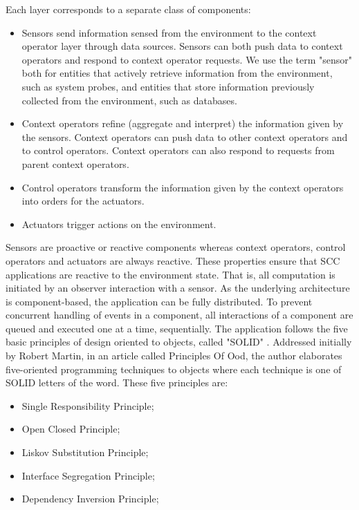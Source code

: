 \documentclass{acm_proc_article-sp}
\begin{document}
Each layer corresponds to a separate class of components: 
\begin{itemize}
\item Sensors send information sensed from the environment to the context operator layer through data sources. Sensors can both push data to context operators and respond to context operator requests. We use the term "sensor" both for entities that actively retrieve information from the environment, such as system probes, and entities that store information previously collected from the environment, such as databases.
\item Context operators refine (aggregate and interpret) the information given by the sensors. Context operators can push data to other context operators and to control operators. Context operators can also respond to requests from parent context operators. 
\item Control operators transform the information given by the context operators into orders for the actuators. 
\item Actuators trigger actions on the environment.
\end{itemize}

Sensors are proactive or reactive components whereas context operators, control operators and actuators are always reactive. These properties ensure that SCC applications are reactive to the environment state. That is, all computation is initiated by an observer interaction with a sensor.
\newline
\newline
As the underlying architecture is component-based, the application can be fully distributed. To prevent concurrent handling of events in a component, all interactions of a component are queued and executed one at a time, sequentially.
\newline
\newline
The application follows the five basic principles of design oriented to objects, called "SOLID" \cite{DanielPace}. Addressed initially by Robert Martin, in an article called Principles Of Ood, the author elaborates five-oriented programming techniques to objects where each technique is one of SOLID letters of the word. These five principles are:
\begin{itemize}
\item Single Responsibility Principle;
\item Open Closed Principle;
\item Liskov Substitution Principle;
\item Interface Segregation Principle;
\item Dependency Inversion Principle;
\end{itemize} 
\end{document}
